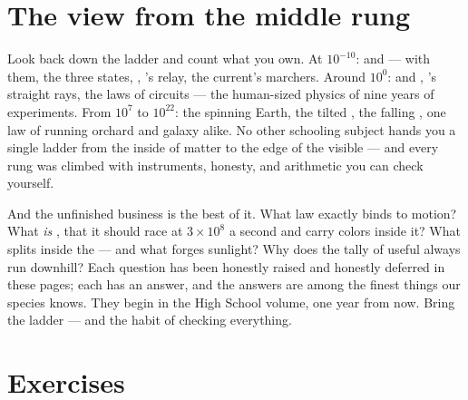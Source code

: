 \section{The view from the middle rung}

\begin{remark}\label{rem:g9:atoms-to-galaxies:built}
Look back down the ladder and count what you own. At
$10^{-10}$:  and  --- with them, the three
states, , 's relay, the current's marchers. Around
$10^{0}$:  and , 's straight rays, the
laws of circuits --- the human-sized physics of nine years
of experiments. From $10^{7}$ to $10^{22}$: the spinning
Earth, the tilted , the falling , one law of
 running orchard and galaxy alike. No other
schooling subject hands you a single ladder from the inside
of matter to the edge of the visible --- and every rung was
climbed with instruments, honesty, and arithmetic you can
check yourself.
\end{remark}

\begin{remark}\label{rem:g9:atoms-to-galaxies:ahead}
And the unfinished business is the best of it. What law
exactly binds  to motion? What \emph{is} , that
it should race at $3 \times 10^{8}$  a second and
carry colors inside it? What splits inside the  ---
and what forges sunlight? Why does the tally of useful
 always run downhill? Each question has been honestly
raised and honestly deferred in these pages; each has an
answer, and the answers are among the finest things our
species knows. They begin in the High School volume, one
year from now. Bring the ladder --- and the habit of
checking everything.
\end{remark}

\section{Exercises}

